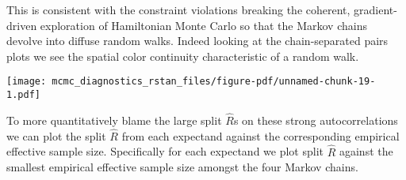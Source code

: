 \documentclass[
  letterpaper,
  DIV=11,
  numbers=noendperiod]{scrartcl}
\newenvironment{Shaded}{\begin{snugshade}}{\end{snugshade}}
\newcommand{\AttributeTok}[1]{\textcolor[rgb]{0.40,0.45,0.13}{#1}}
\newcommand{\DecValTok}[1]{\textcolor[rgb]{0.68,0.00,0.00}{#1}}
\newcommand{\FloatTok}[1]{\textcolor[rgb]{0.68,0.00,0.00}{#1}}
\newcommand{\FunctionTok}[1]{\textcolor[rgb]{0.28,0.35,0.67}{#1}}
\newcommand{\NormalTok}[1]{\textcolor[rgb]{0.00,0.23,0.31}{#1}}
\newcommand{\OtherTok}[1]{\textcolor[rgb]{0.00,0.23,0.31}{#1}}
\newcommand{\SpecialCharTok}[1]{\textcolor[rgb]{0.37,0.37,0.37}{#1}}
\newcommand{\StringTok}[1]{\textcolor[rgb]{0.13,0.47,0.30}{#1}}
\begin{document}
This is consistent with the constraint violations breaking the coherent,
gradient-driven exploration of Hamiltonian Monte Carlo so that the
Markov chains devolve into diffuse random walks. Indeed looking at the
chain-separated pairs plots we see the spatial color continuity
characteristic of a random walk.

\begin{Shaded}
\end{Shaded}

\texttt{[image: mcmc\_diagnostics\_rstan\_files/figure-pdf/unnamed-chunk-19-1.pdf]}

To more quantitatively blame the large split \(\hat{R}\)s on these
strong autocorrelations we can plot the split \(\hat{R}\) from each
expectand against the corresponding empirical effective sample size.
Specifically for each expectand we plot split \(\hat{R}\) against the
smallest empirical effective sample size amongst the four Markov chains.

\begin{Shaded}
\end{Shaded}
\end{document}
